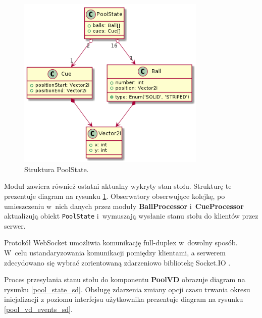 \documentclass[12pt]{article}
\begin{document}
\begin{figure}[!htb]
    \centering
    \includegraphics[width=9cm]{./diagrams/out/pull_state_cd.png}
    \caption{Struktura PoolState.}
    \label{poolstate}
\end{figure}

Moduł zawiera również ostatni aktualny wykryty stan stołu. Strukturę te prezentuje diagram na rysunku \ref{poolstate}.
Obserwatory obserwujące kolejkę, po umieszczeniu w~nich danych przez moduły \textbf{BallProcessor} i~\textbf{CueProcessor} aktualizują obiekt \lstinline{PoolState} i~wymuszają wysłanie stanu stołu do klientów przez serwer.

Protokół WebSocket umożliwia komunikację full-duplex w~dowolny sposób. W~celu ustandaryzowania komunikacji pomiędzy klientami, a serwerem zdecydowano się wybrać zorientowaną zdarzeniowo bibliotekę Socket.IO \cite{socket.io}.

Proces przesyłania stanu stołu do komponentu \textbf{PoolVD} obrazuje diagram na rysunku \ref{pool_state_sd}. Obsługę zdarzenia zmiany opcji czasu trwania okresu inicjalizacji z poziomu interfejsu użytkownika prezentuje diagram na rysunku \ref{pool_vd_events_sd}.
\end{document}
